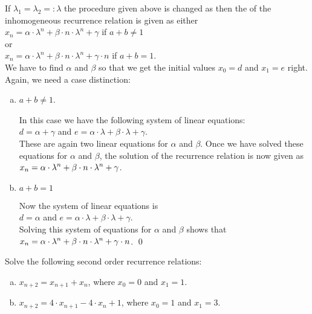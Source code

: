 If $\lambda_1 = \lambda_2 =: \lambda$  the procedure given above is changed as then the  of
the inhomogeneous recurrence relation is given as either
\\[0.2cm]
\hspace*{1.3cm}
$x_n = \alpha \cdot \lambda^n + \beta \cdot n \cdot \lambda^n + \gamma$ \quad if $a + b \not= 1$
\\[0.2cm]
or
\\[0.2cm]
\hspace*{1.3cm}
$x_n = \alpha \cdot \lambda^n + \beta \cdot n \cdot \lambda^n + \gamma \cdot n$ \quad if $a + b = 1$.
\\[0.2cm]
We have to find $\alpha$ and $\beta$ so that we get the initial values $x_0 = d$ and $x_1 = e$ right.
Again, we need a case distinction:
\begin{enumerate}[(a)]
\item $a + b \not = 1$.
  
      In this case we have the following system of linear equations:
      \\[0.2cm]
      \hspace*{1.3cm}
      $d = \alpha + \gamma$ \quad and \quad $e = \alpha \cdot \lambda + \beta \cdot \lambda + \gamma$.
      \\[0.2cm]
      These are again two linear equations for $\alpha$ and $\beta$.  
      Once we have solved these equations for $\alpha$ and
      $\beta$, the solution of the recurrence relation is now given as
      \\[0.2cm]
      \hspace*{1.3cm}
      $\displaystyle x_{n} = \alpha \cdot \lambda^n + \beta \cdot n \cdot \lambda^n + \gamma$.
\item $a + b = 1$
      
      Now the system of linear equations is 
      \\[0.2cm]
      \hspace*{1.3cm}
      $d = \alpha$ \quad and \quad $e = \alpha \cdot \lambda + \beta \cdot \lambda + \gamma$. 
      \\[0.2cm]
      Solving this system of equations for $\alpha$ and $\beta$ shows that
      \\[0.2cm]
      \hspace*{1.3cm}
      $\displaystyle x_{n} = \alpha \cdot \lambda^n + \beta \cdot n \cdot \lambda^n + \gamma \cdot n$. \qed
\end{enumerate}

\exercise
 Solve the following second order recurrence relations:
\begin{enumerate}[(a)]
\item $x_{n+2} = x_{n+1} + x_n$, \quad where $x_0 = 0$ and $x_1 = 1$.  
\item $x_{n+2} = 4 \cdot x_{n+1} - 4 \cdot x_n + 1$, \quad where $x_0 = 1$ and $x_1 = 3$.  \eox
\end{enumerate}


